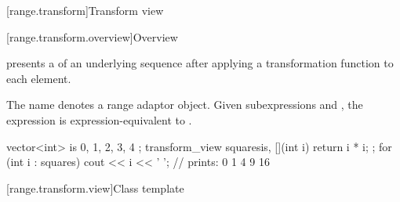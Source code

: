 [range.transform]{Transform view}

[range.transform.overview]{Overview}

\pnum
{} presents
a  of an underlying sequence after
applying a transformation function to each element.

\pnum
The name  denotes a
range adaptor object.
Given subexpressions  and , the expression
 is expression-equivalent to
.

\pnum
\begin{example}
\begin{codeblock}
vector<int> is{ 0, 1, 2, 3, 4 };
transform_view squares{is, [](int i) { return i * i; }};
for (int i : squares)
  cout << i << ' '; // prints: 0 1 4 9 16
\end{codeblock}
\end{example}

[range.transform.view]{Class template }

